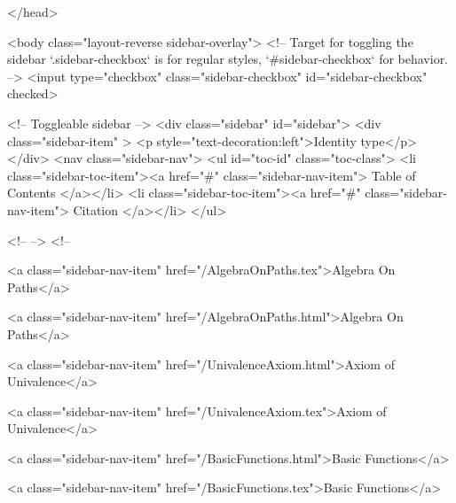   
</head>




  <body class="layout-reverse sidebar-overlay">
    <!-- Target for toggling the sidebar `.sidebar-checkbox` is for regular
     styles, `#sidebar-checkbox` for behavior. -->
<input type="checkbox" class="sidebar-checkbox" id="sidebar-checkbox" checked>

<!-- Toggleable sidebar -->
<div class="sidebar" id="sidebar">
  <div class="sidebar-item" >
    <p style="text-decoration:left">Identity type</p>
  </div>
  <nav class="sidebar-nav">
    <ul id="toc-id" class="toc-class">
  <li class="sidebar-toc-item"><a href="#" class="sidebar-nav-item"> Table of Contents </a></li>
  <li class="sidebar-toc-item"><a href="#" class="sidebar-nav-item"> Citation </a></li>
</ul>


    <!--  -->
    <!-- 
      
    
      
    
      
    
      
        
      
    
      
        
          <a class="sidebar-nav-item" href="/AlgebraOnPaths.tex">Algebra On Paths</a>
        
      
    
      
        
          <a class="sidebar-nav-item" href="/AlgebraOnPaths.html">Algebra On Paths</a>
        
      
    
      
        
          <a class="sidebar-nav-item" href="/UnivalenceAxiom.html">Axiom of Univalence</a>
        
      
    
      
        
          <a class="sidebar-nav-item" href="/UnivalenceAxiom.tex">Axiom of Univalence</a>
        
      
    
      
        
          <a class="sidebar-nav-item" href="/BasicFunctions.html">Basic Functions</a>
        
      
    
      
        
          <a class="sidebar-nav-item" href="/BasicFunctions.tex">Basic Functions</a>
        
      
    
